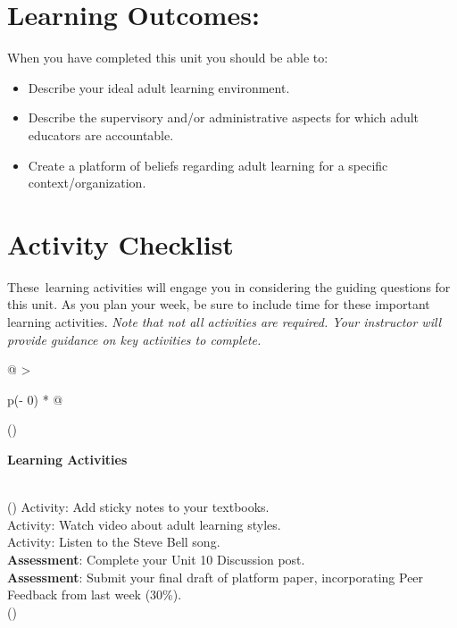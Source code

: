 \documentclass[
]{book}
\begin{document}
\hypertarget{learning-outcomes-9}{%
\section*{Learning Outcomes:}\label{learning-outcomes-9}}

When you have completed this unit you should be able to:

\begin{itemize}
\item
  Describe your ideal adult learning environment.
\item
  Describe the supervisory and/or administrative aspects for which
  adult educators are accountable.
\item
  Create a platform of beliefs regarding adult learning for a specific
  context/organization.
\end{itemize}

\hypertarget{activity-checklist-9}{%
\section*{Activity Checklist}\label{activity-checklist-9}}

These~learning activities will engage you in considering the guiding questions for this unit. As you plan your week, be sure to include time for these important learning activities. \emph{Note that not all activities are required. Your instructor will provide guidance on key activities to complete.}

\begin{longtable}[]{@{}
  >{\raggedright\arraybackslash}p{(\columnwidth - 0\tabcolsep) * }@{}}
\toprule()
\begin{minipage}[b]{\linewidth}\raggedright
\textbf{Learning Activities}
\end{minipage} \\
\midrule()
\endhead
Activity: Add sticky notes to your textbooks. \\
Activity: Watch video about adult learning styles. \\
Activity: Listen to the Steve Bell song. \\
\textbf{Assessment}: Complete your Unit 10 Discussion post. \\
\textbf{Assessment}: Submit your final draft of platform paper, incorporating Peer Feedback from last week (30\%). \\
\bottomrule()
\end{longtable}
\end{document}
